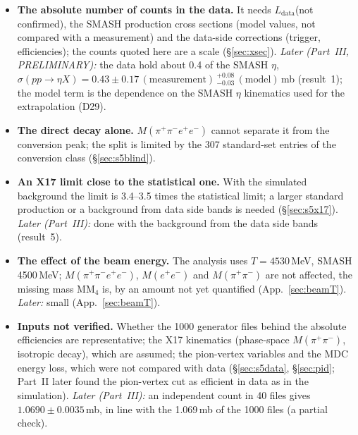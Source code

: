 \documentclass[11pt,a4paper]{article}
\newcommand{\Mfour}{\ensuremath{M(\pi^{+}\pi^{-}e^{+}e^{-})}\xspace}
\newcommand{\Mee}{\ensuremath{M(e^{+}e^{-})}\xspace}
\newcommand{\Mpipi}{\ensuremath{M(\pi^{+}\pi^{-})}\xspace}
\newcommand{\Ldata}{\ensuremath{L_{\mathrm{data}}}\xspace}
\begin{document}
\begin{itemize}
      ghost-flagged true pairs as physical background raises the simulation by 9--17\,\% (note after Table~\ref{tab:classes}).
\item \textbf{The absolute number of counts in the data.} It needs \Ldata (not confirmed), the SMASH production cross
      sections (model values, not compared with a measurement) and the data-side corrections (trigger, efficiencies);
      the counts quoted here are a scale (\S\ref{sec:xsec}). \emph{Later (Part~III, PRELIMINARY):} the data hold about
      0.4 of the SMASH $\eta$, $\sigma(pp\to\eta X)=0.43\pm0.17\,(\mathrm{measurement})\,^{+0.08}_{-0.03}\,(\mathrm{model})$\,mb
      (result~1); the model term is the dependence on the SMASH $\eta$ kinematics used for the extrapolation (D29).
\item \textbf{The direct decay alone.} \Mfour cannot separate it from the conversion peak; the split is limited by the
      307 standard-set entries of the conversion class (\S\ref{sec:s5blind}).
\item \textbf{An X17 limit close to the statistical one.} With the simulated background the limit is 3.4--3.5 times
      the statistical limit; a larger standard production or a background from data side bands is needed
      (\S\ref{sec:s5x17}). \emph{Later (Part~III):} done with the background from the data side bands (result~5).
\item \textbf{The effect of the beam energy.} The analysis uses $T = 4530$\,MeV, SMASH 4500\,MeV; \Mfour, \Mee and
      \Mpipi are not affected, the missing mass $\mathrm{MM}_4$ is, by an amount not yet quantified (App.~\ref{sec:beamT}).
      \emph{Later:} small (App.~\ref{sec:beamT}).
\item \textbf{Inputs not verified.} Whether the 1000 generator files behind the absolute efficiencies are
      representative; the X17 kinematics (phase-space \Mpipi, isotropic decay), which are assumed; the pion-vertex
      variables and the MDC energy loss, which were not compared with data (\S\ref{sec:s5data}, \S\ref{sec:pid}; Part~II later
      found the pion-vertex cut as efficient in data as in the simulation). \emph{Later (Part~III):} an independent count in
      40 files gives $1.0690\pm0.0035$\,mb, in line with the 1.069\,mb of the 1000 files (a partial check).
\end{itemize}
\end{document}

